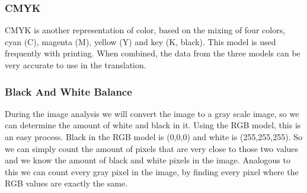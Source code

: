 \documentclass[12pt]{article}
\begin{document}
\subsubsection{CMYK}
CMYK is another representation of color, based on the mixing of four colors, cyan (C), magenta (M), yellow (Y) and key (K, black). This model is used frequently with printing.
\newline
When combined, the data from the three models can be very accurate to use in the translation.

\subsubsection{Black And White Balance}
During the image analysis we will convert the image to a gray scale image, so we can determine the amount of white and black in it. Using the RGB model, this is an easy process. Black in the RGB model is (0,0,0) and white is (255,255,255). So we can simply count the amount of pixels that are very close to those two values and we know the amount of black and white pixels in the image.
\newline
Analogous to this we can count every gray pixel in the image, by finding every pixel where the RGB values are exactly the same.
\end{document}
